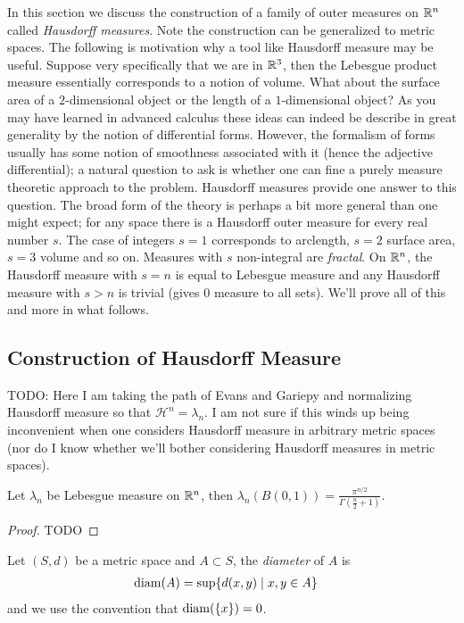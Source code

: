 In this section we discuss the construction of a family of outer
measures on $\mathbb{R}^n$ called \emph{Hausdorff measures}.  Note the
construction can be generalized to metric spaces.  The following is
motivation why a tool like Hausdorff measure may be useful.  Suppose
very specifically that we are
in $\mathbb{R}^3$, then the Lebesgue product measure essentially
corresponds to a notion of volume.  What about the surface area of a
$2$-dimensional object or the length of a $1$-dimensional object?  As
you may have learned in advanced calculus these ideas can indeed be
describe in great generality by the notion of differential forms.
However, the formalism of forms usually has some notion of smoothness
associated with it (hence the adjective differential); a natural question to ask is whether one can fine
a purely measure theoretic approach to the problem.  Hausdorff measures
provide one answer to this question.   The broad form of the theory
is perhaps a bit more general than one might expect; for any space
there is a Hausdorff outer measure for every real number $s$.  The
case of integers
$s=1$ corresponds to arclength, $s=2$ surface area, $s=3$ volume and so
on.  Measures with $s$ non-integral are
\emph{fractal}.  On $\mathbb{R}^n$, the Hausdorff measure with $s=n$ is equal to
Lebesgue measure and any Hausdorff measure with $s > n$ is trivial
(gives $0$ measure to all sets).  We'll prove all of this and more in
what follows.

\subsection{Construction of Hausdorff Measure}

TODO:  Here I am taking the path of Evans and Gariepy and normalizing
Hausdorff measure so that $\mathcal{H}^n = \lambda_n$.  I am not sure
if this winds up being inconvenient when one considers Hausdorff
measure in arbitrary metric spaces (nor do I know whether we'll bother
considering Hausdorff measures in metric spaces).

\begin{lem}Let $\lambda_n$ be Lebesgue measure on $\mathbb{R}^n$, then
  $\lambda_n(B(0, 1)) = \frac{\pi^{n/2}}{\Gamma(\frac{n}{2} + 1)}$.
\end{lem}
\begin{proof}
TODO
\end{proof}

\begin{defn}Let $(S,d)$ be a metric space and $A \subset S$, the
  \emph{diameter} of $A$ is 
\begin{align*}
\operatorname*{diam}(A) &= \sup \lbrace d(x,y) \mid x,y \in A \rbrace
\end{align*}
and we use the convention that $\operatorname*{diam}(\lbrace x \rbrace) = 0$.
\end{defn}

